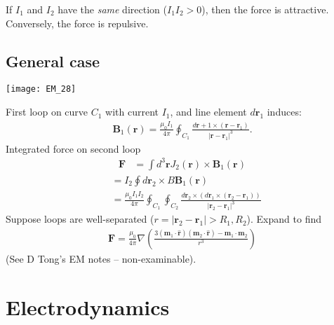 \documentclass[a4paper]{article}
\begin{document}
If $I_1$ and $I_2$ have the \emph{same} direction ($I_1 I_2>0$), then the force is attractive. Conversely, the force is repulsive.

\subsection{General case}

\texttt{[image: EM\_28]}

First loop on curve $C_1$ with current $I_1$, and line element $d\mathbf{r}_1$ induces:
\begin{equation*}
\begin{aligned}
\mathbf{B}_1 (\mathbf{r}) = \frac{\mu_0 I_1}{4\pi} \oint_{C_1} \frac{d\mathbf{r}+1 \times (\mathbf{r}-\mathbf{r}_1)}{|\mathbf{r}-\mathbf{r}_1|^3}.
\end{aligned}
\end{equation*}
Integrated force on second loop
\begin{equation*}\tag{3.27} \label{eq:3.27}
\begin{aligned}
\mathbf{F} &= \int d^3 \mathbf{r} J_2 (\mathbf{r}) \times \mathbf{B}_1(\mathbf{r})
\end{aligned}
\end{equation*}
\begin{equation*}\tag{3.28} \label{eq:3.28}
\begin{aligned}
&= I_2 \oint d\mathbf{r}_2 \times B\mathbf{B}_1(\mathbf{r})\\
&= \frac{\mu_0 I_1I_2}{4\pi} \oint_{C_1} \oint_{C_2} \frac{d\mathbf{r}_2 \times (d\mathbf{r}_1 \times (\mathbf{r}_2 - \mathbf{r}_1))}{|\mathbf{r}_2-\mathbf{r}_1|^3}
\end{aligned}
\end{equation*}
Suppose loops are well-separated ($r=|\mathbf{r}_2-\mathbf{r}_1| > R_1,R_2$). Expand to find
\begin{equation*}\tag{3.29} \label{eq:3.29}
\begin{aligned}
\mathbf{F} = \frac{\mu_0}{4\pi} \nabla \left(\frac{3(\mathbf{m}_1 \cdot \hat{\mathbf{r}})(\mathbf{m}_2\cdot \hat{\mathbf{r}}) - \mathbf{m}_1 \cdot \mathbf{m}_2}{r^3}\right)
\end{aligned}
\end{equation*}
(See D Tong's EM notes -- non-examinable).

\newpage

\section{Electrodynamics}
\end{document}
